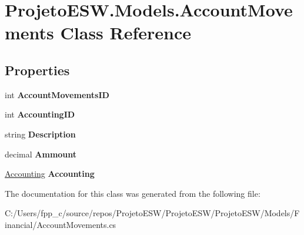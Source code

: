 \hypertarget{class_projeto_e_s_w_1_1_models_1_1_account_movements}{}\section{Projeto\+E\+S\+W.\+Models.\+Account\+Movements Class Reference}
\label{class_projeto_e_s_w_1_1_models_1_1_account_movements}
\subsection*{Properties}
\begin{DoxyCompactItemize}
\item 
\mbox{\label{class_projeto_e_s_w_1_1_models_1_1_account_movements_abcdccdc6c2cde0720fd3bad46cb5c158}} 
int {\bfseries Account\+Movements\+ID}
\item 
\mbox{\label{class_projeto_e_s_w_1_1_models_1_1_account_movements_a06c9475ce9ecc6cabdd1466954e74095}} 
int {\bfseries Accounting\+ID}
\item 
\mbox{\label{class_projeto_e_s_w_1_1_models_1_1_account_movements_a15ceebba99ac4c4ec66da045ca809820}} 
string {\bfseries Description}
\item 
\mbox{\label{class_projeto_e_s_w_1_1_models_1_1_account_movements_a736802e407d4dc77061efbb718dca004}} 
decimal {\bfseries Ammount}
\item 
\mbox{\label{class_projeto_e_s_w_1_1_models_1_1_account_movements_a962d107685c1ebd91bba16d9657f8af1}} 
\mbox{\hyperlink{class_projeto_e_s_w_1_1_models_1_1_accounting}{Accounting}} {\bfseries Accounting}
\end{DoxyCompactItemize}


The documentation for this class was generated from the following file\+:\begin{DoxyCompactItemize}
\item 
C\+:/\+Users/fpp\+\_\+c/source/repos/\+Projeto\+E\+S\+W/\+Projeto\+E\+S\+W/\+Projeto\+E\+S\+W/\+Models/\+Financial/Account\+Movements.\+cs\end{DoxyCompactItemize}

